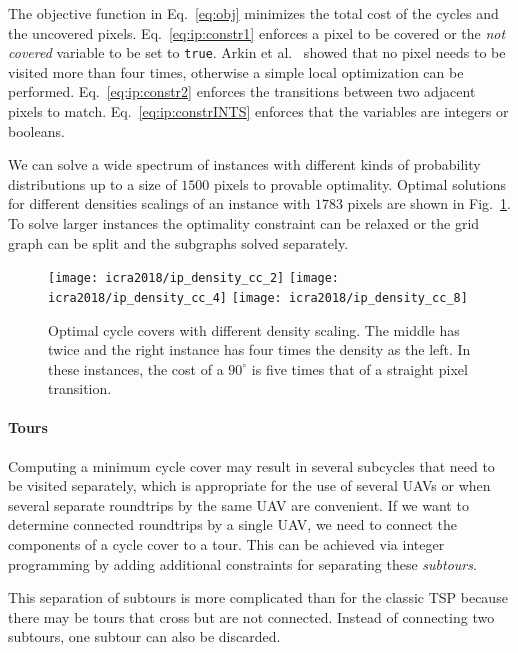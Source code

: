 The objective function in Eq.~\ref{eq:obj} minimizes the total cost of the cycles and the uncovered pixels.
Eq.~\ref{eq:ip:constr1} enforces a pixel to be covered or the \emph{not covered} variable to be set to {\tt true}.
Arkin et al.~\cite{arkin2005optimal} showed that no pixel needs to be visited more than four times, otherwise a simple local optimization 
can be performed.
Eq.~\ref{eq:ip:constr2} enforces the transitions between two adjacent pixels to match.
Eq.~\ref{eq:ip:constrINTS} enforces that the variables are integers or booleans.

We can solve a wide spectrum of instances with different kinds of probability distributions up to a size of 
$1500$ pixels to provable optimality.  
Optimal solutions for different densities scalings of an instance with $1783$ pixels are shown in Fig.~\ref{fig:ip:differentdensities}. 
To solve larger instances the optimality constraint can be relaxed or the grid graph can be split and 
the subgraphs solved separately.
\begin{figure}
	\centering
	\texttt{[image: icra2018/ip\_density\_cc\_2]}
	\texttt{[image: icra2018/ip\_density\_cc\_4]}
	\texttt{[image: icra2018/ip\_density\_cc\_8]}
	\caption{Optimal cycle covers with different density scaling. The middle has twice and the right instance has four times the density as the left. {In these instances, the cost of a $90^\circ$ is five times that of a straight pixel transition.}}
	\label{fig:ip:differentdensities}
	\vspace{-1em}
\end{figure}

\paragraph{Tours}
Computing a minimum cycle cover may result in several subcycles that need to be visited separately, which is appropriate
for the use of several UAVs or when several separate roundtrips by the same UAV are convenient.
If we want to determine connected roundtrips by a single UAV, we need to connect the components of
a cycle cover to a tour. This can be achieved via integer programming by adding additional constraints for
separating these {\em subtours}.

This separation of subtours is more complicated than for the classic TSP because there may be tours that 
cross but are not connected. Instead of connecting two subtours, one subtour can also be discarded.

